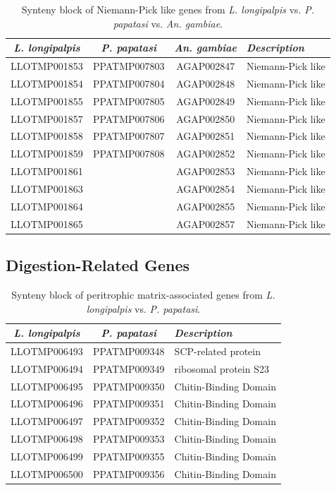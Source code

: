 \begin{table}[H]
  \centering
  \begin{tabular}{c c c l} \hline
    \emph{L. longipalpis} & \emph{P. papatasi} & \emph{An. gambiae} & \emph{Description} \\ \hline
    LLOTMP001853 & PPATMP007803 & AGAP002847 & Niemann-Pick like \\
    LLOTMP001854 & PPATMP007804 & AGAP002848 & Niemann-Pick like \\
    LLOTMP001855 & PPATMP007805 & AGAP002849 & Niemann-Pick like \\
    LLOTMP001857 & PPATMP007806 & AGAP002850 & Niemann-Pick like \\
    LLOTMP001858 & PPATMP007807 & AGAP002851 & Niemann-Pick like \\
    LLOTMP001859 & PPATMP007808 & AGAP002852 & Niemann-Pick like \\
    LLOTMP001861 & & AGAP002853 & Niemann-Pick like \\
    LLOTMP001863 & & AGAP002854 & Niemann-Pick like \\
    LLOTMP001864 & & AGAP002855 & Niemann-Pick like \\
    LLOTMP001865 & & AGAP002857 & Niemann-Pick like
    \end{tabular}
    \caption{Synteny block of Niemann-Pick like genes from \emph{L. longipalpis} vs. \emph{P. papatasi} vs. \emph{An. gambiae}.}
  \label{tab:synteny-three-way-npc2}
\end{table}

\subsection{Digestion-Related Genes}



\begin{table}[H]
  \centering
  \begin{tabular}{c c l} \hline
    \emph{L. longipalpis} & \emph{P. papatasi} & \emph{Description} \\ \hline
    LLOTMP006493 & PPATMP009348 & SCP-related protein \\
    LLOTMP006494 & PPATMP009349 & ribosomal protein S23 \\
    LLOTMP006495 & PPATMP009350 & Chitin-Binding Domain \\
    LLOTMP006496 & PPATMP009351 & Chitin-Binding Domain \\
    LLOTMP006497 & PPATMP009352 & Chitin-Binding Domain \\
    LLOTMP006498 & PPATMP009353 & Chitin-Binding Domain \\
    LLOTMP006499 & PPATMP009355 & Chitin-Binding Domain \\
    LLOTMP006500 & PPATMP009356 & Chitin-Binding Domain
  \end{tabular}
  \caption{Synteny block of peritrophic matrix-associated genes from \emph{L. longipalpis} vs. \emph{P. papatasi}.}
  \label{tab:synteny-llot-ppat-peritrophic}
\end{table}


